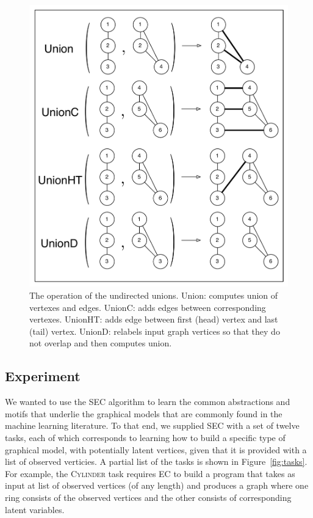 \documentclass{article} %
\begin{document}
\begin{figure}[h]
\begin{minipage}[t]{.5\textwidth}
  \includegraphics[width=\linewidth]{./figures/GraphCombinators.pdf}
  \caption{The operation of the undirected unions. Union: computes union of vertexes and edges. UnionC: adds edges between corresponding vertexes. UnionHT: adds edge between first (head) vertex and last (tail) vertex. UnionD: relabels input graph vertices so that they do not overlap and then computes union.}
  \label{fig:graphcomb}\par\vfill
\end{minipage}
\end{figure}

\subsection{Experiment}

We wanted to use the SEC algorithm to learn the common abstractions and motifs that underlie the graphical models that are commonly found in the machine learning literature. To that end, we supplied SEC with a set of twelve tasks, each of which corresponds to learning how to build a specific type of graphical model, with potentially latent vertices, given that it is provided with a list of observed verticies. A partial list of the tasks is shown in Figure~\ref{fig:tasks}. For example, the \textsc{Cylinder} task requires EC to build a program that takes as input at list of observed vertices (of any length) and produces a graph where one ring consists of the observed vertices and the other consists of corresponding latent variables. 
\end{document}
